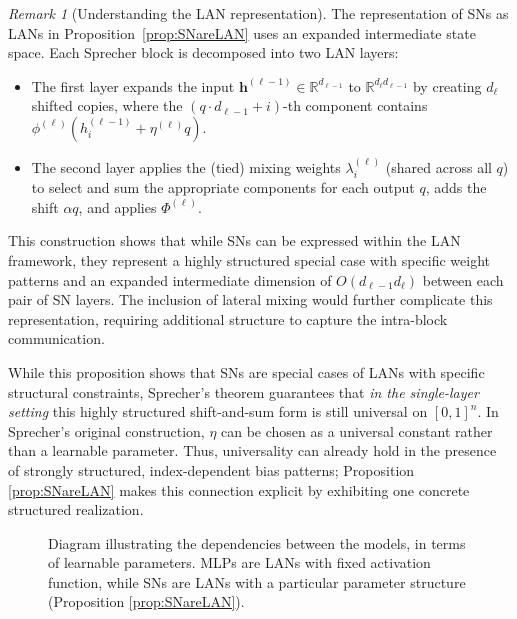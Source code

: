\documentclass{article}
\theoremstyle{plain}
\theoremstyle{definition}
\theoremstyle{remark}
\newtheorem{remark}{Remark}
\begin{document}
\begin{remark}[Understanding the LAN representation]
The representation of SNs as LANs in Proposition~\ref{prop:SNareLAN} uses an expanded 
intermediate state space. Each Sprecher block is decomposed into two LAN layers:
\begin{itemize}
\item The first layer expands the input $\mathbf{h}^{(\ell-1)} \in \mathbb{R}^{d_{\ell-1}}$ 
to $\mathbb{R}^{d_\ell d_{\ell-1}}$ by creating $d_\ell$ shifted copies, where the 
$(q \cdot d_{\ell-1} + i)$-th component contains $\phi^{(\ell)}(h^{(\ell-1)}_i + \eta^{(\ell)} q)$.
\item The second layer applies the (tied) mixing weights $\lambda^{(\ell)}_{i}$ (shared across all $q$) to select and sum 
the appropriate components for each output $q$, adds the shift $\alpha q$, and applies $\Phi^{(\ell)}$.
\end{itemize}
This construction shows that while SNs can be expressed within the LAN framework, they 
represent a highly structured special case with specific weight patterns and an expanded 
intermediate dimension of $O(d_{\ell-1} d_\ell)$ between each pair of SN layers. The inclusion of lateral mixing would further complicate this representation, requiring additional structure to capture the intra-block communication.
\end{remark}

While this proposition shows that SNs are special cases of LANs with specific structural constraints, Sprecher's theorem guarantees that \emph{in the single-layer setting} this highly structured shift-and-sum form is still universal on $[0,1]^n$. In Sprecher's original construction, $\eta$ can be chosen as a universal constant rather than a learnable parameter. Thus, universality can already hold in the presence of strongly structured, index-dependent bias patterns; Proposition \ref{prop:SNareLAN} makes this connection explicit by exhibiting one concrete structured realization.

\begin{figure}[h!]
    \centering  
{}
    \caption{Diagram illustrating the dependencies between the models, in terms of learnable parameters. MLPs are LANs with fixed activation function, while SNs are LANs with a particular parameter structure (Proposition \ref{prop:SNareLAN}).}
    \label{fig:model_dependencies}
\end{figure}
\end{document}

